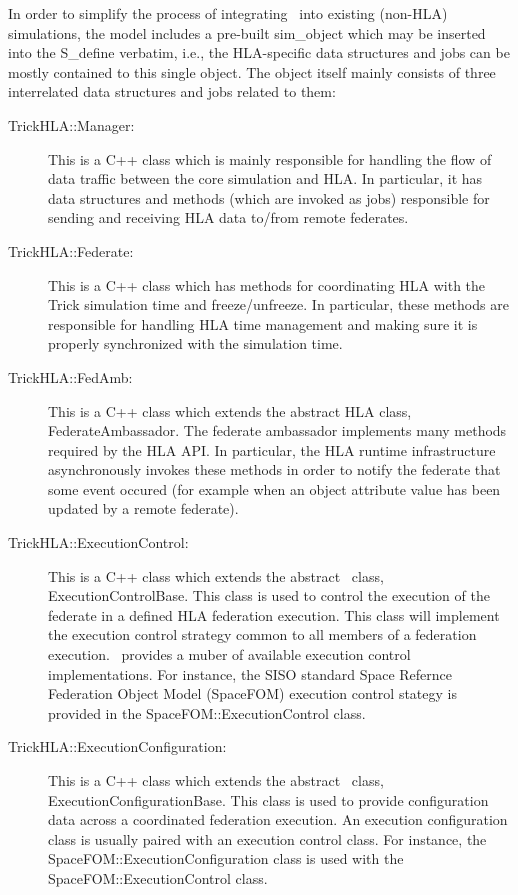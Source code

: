 In order to simplify the process of integrating \TrickHLA\ into existing (non-HLA)
simulations,
the model includes a pre-built {\ttfamily sim\_object} which may be inserted into
the {\ttfamily S\_define} verbatim, 
i.e., the HLA-specific data structures and jobs can be mostly contained to this
single object.
The object itself mainly consists of three interrelated data structures and jobs 
related to them:
%
\begin{description}
  \item[TrickHLA::Manager:]{
    This is a C++ class which is mainly responsible for handling the flow of data traffic
    between the core simulation and HLA.
    In particular, it has data structures and methods (which are invoked as jobs)
    responsible for sending and receiving HLA data to/from remote federates.
  }
  \item[TrickHLA::Federate:]{
    This is a C++ class which has methods for coordinating HLA with the Trick
    simulation time and freeze/unfreeze.
    In particular, these methods are responsible for handling HLA time management
    and making sure it is properly synchronized with the simulation time.
  }
  \item[TrickHLA::FedAmb:]{
    This is a C++ class which extends the abstract HLA class,
    {\ttfamily FederateAmbassador}.
    The federate ambassador implements many methods required by the HLA API.
    In particular, the HLA runtime infrastructure asynchronously invokes these methods
    in order to notify the federate that some event occured
    (for example when an object attribute value has been updated by a remote federate).
  }
  \item[TrickHLA::ExecutionControl:]{
    This is a C++ class which extends the abstract \TrickHLA\ class,
    {\ttfamily ExecutionControlBase}.
    This class is used to control the execution of the federate in a defined
    HLA federation execution.  This class will implement the execution
    control strategy common to all members of a federation execution.
    \TrickHLA\ provides a muber of available execution control implementations.
    For instance, the SISO standard Space Refernce Federation Object Model
    (SpaceFOM) execution control stategy is provided in the
    {\ttfamily SpaceFOM::ExecutionControl} class.
    
  }
  \item[TrickHLA::ExecutionConfiguration:]{
    This is a C++ class which extends the abstract \TrickHLA\ class,
    {\ttfamily ExecutionConfigurationBase}.
    This class is used to provide configuration data across a coordinated
    federation execution.  An execution configuration class is usually paired
    with an execution control class.  For instance, the
    {\ttfamily SpaceFOM::ExecutionConfiguration} class is used with the
    {\ttfamily SpaceFOM::ExecutionControl} class.
  }
\end{description}

